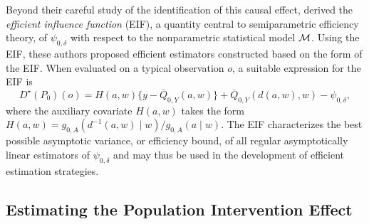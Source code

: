 Beyond their careful study of the identification of this causal effect,
\citet{diaz2012population, diaz2018stochastic} derived the \textit{efficient
influence function} (EIF), a quantity central to semiparametric efficiency
theory, of $\psi_{0, \delta}$ with respect to the nonparametric statistical
model $\mathcal{M}$. Using the EIF, these authors proposed efficient estimators
constructed based on the form of the EIF. When evaluated on a typical
observation $o$, a suitable expression for the EIF is
\begin{equation}\label{eqn:one_eif_full}
  D^{\star}(P_0)(o) = H(a, w)\{y - \overline{Q}_{0,Y}(a, w)\} +
  \overline{Q}_{0,Y}(d(a, w), w) - \psi_{0,\delta},
\end{equation}
where the auxiliary covariate $H(a,w)$ takes the form $H(a, w) = g_{0,
A}(d^{-1}(a, w) \mid w) / g_{0, A}(a \mid w)$. The EIF characterizes the best
possible asymptotic variance, or efficiency bound, of all regular asymptotically
linear estimators of $\psi_{0, \delta}$ and may thus be used in the development
of efficient estimation strategies.

\subsection{Estimating the Population Intervention Effect}\label{pie_est}

